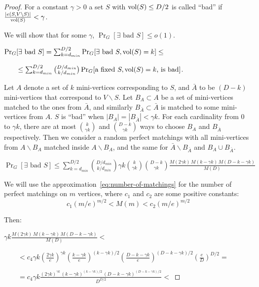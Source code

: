 \begin{proof}
    For a constant $\gamma>0$ a set $S$ with $\operatorname*{vol}(S)\leq D/2$ is called ``bad''
    if $\frac{|e(S,V\backslash S)|}{\operatorname*{vol}(S)}<\gamma$.
    
    We will show that for some $\gamma$, $\Pr_G[\exists\text{ bad }S]\leq o(1)$.
    
    $\Pr_G[\exists\text{ bad }S]
    =\sum_{k=d_{min}}^{D/2}{\Pr_G[\exists\text{ bad }S,\operatorname*{vol}(S)=k]}\leq$
    
    $\qquad\leq\sum_{k=d_{min}}^{D/2}{\binom{D/d_{min}}{k/d_{min}}\Pr_G[\text{a fixed }S,\operatorname*{vol}(S)=k\text{, is bad}]}$.
    
    Let $A$ denote a set of $k$ mini-vertices corresponding to $S$,
    and $\bar{A}$ to be $(D-k)$ mini-vertices that correspond to $V\backslash S$.
    Let $B_A\subset A$ be a set of mini-vertices matched to the ones from $\bar{A}$,
    and similarly $B_{\bar{A}}\subset\bar{A}$ is matched to some mini-vertices from $A$.
    $S$ is ``bad'' when $|B_A|=|B_{\bar{A}}|<\gamma k$.
    For each cardinality from $0$ to $\gamma k$, there are at most
    $\binom{k}{\gamma k}$ and $\binom{D-k}{\gamma k}$ ways
    to choose $B_A$ and $B_{\bar{A}}$ respectively.
    Then we consider a random perfect matchings
    with all mini-vertices from $A\backslash B_A$ matched inside $A\backslash B_A$,
    and the same for $\bar{A}\backslash B_{\bar{A}}$ and $B_A\cup B_{\bar{A}}$.
    
    $\Pr_G[\exists\text{ bad }S]\leq\sum_{k=d_{min}}^{D/2}{
        \binom{D/d_{min}}{k/d_{min}}\gamma k\binom{k}{\gamma k}\binom{D-k}{\gamma k}
        \frac{M(2\gamma k)\,M(k-\gamma k)\,M(D-k-\gamma k)}{M(D)}
    }$

    We will use the approximation~\eqref{eq:number-of-matchings}
    for the number of perfect matchings on $m$ vertices,
    where $c_1$ and $c_2$ are some positive constants:
    \begin{equation}
        c_1(m/e)^{m/2}<M(m)<c_2(m/e)^{m/2}
    \end{equation}

    Then:
    
    $\gamma k\frac{M(2\gamma k)\,M(k-\gamma k)\,M(D-k-\gamma k)}{M(D)}<$
    
    $\qquad<c_4\gamma k
    \left(\frac{2\gamma k}{e}\right)^{\gamma k}
    \left(\frac{k-\gamma k}{e}\right)^{(k-\gamma k)/2}
    \left(\frac{D-k-\gamma k}{e}\right)^{(D-k-\gamma k)/2}
    \left(\frac{e}{D}\right)^{D/2}=$
    
    $\qquad=c_4\gamma k\frac{
        (2\gamma k)^{\gamma k}\,
        (k-\gamma k)^{(k-\gamma k)/2}\,
        (D-k-\gamma k)^{(D-k-\gamma k)/2}
    }{D^{D/2}}<$


\end{proof}
